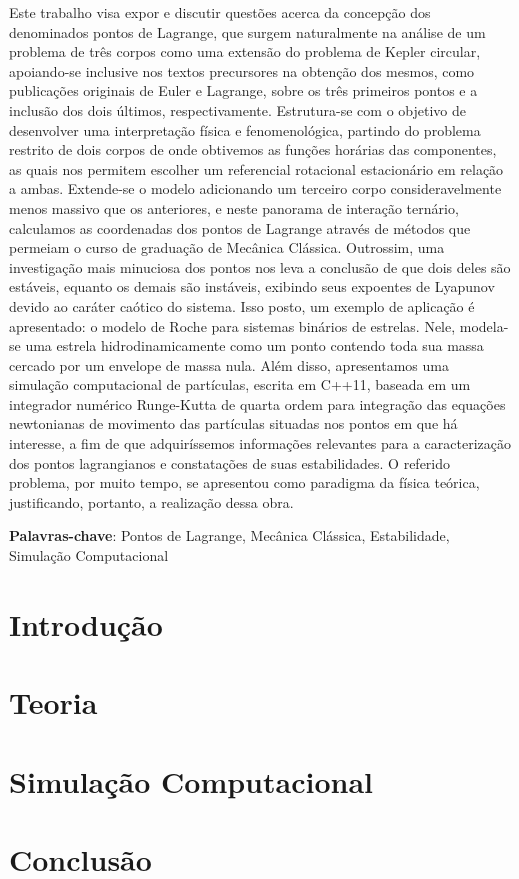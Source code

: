 \documentclass[10pt,twoside,a4paper,brazil]{abntex2}
\begin{document}
   \imprimircapa
   
   \imprimirfolhaderosto   
   
   \tableofcontents

	 \newpage
	 
   \begin{resumo}
      Este trabalho visa expor e discutir questões acerca da concepção dos denominados pontos de Lagrange, que surgem naturalmente na análise de um problema de três corpos como uma extensão do problema de Kepler circular, apoiando-se inclusive nos textos precursores na obtenção dos mesmos, como publicações originais de Euler e Lagrange, sobre os três primeiros pontos e a inclusão dos dois últimos, respectivamente. Estrutura-se com o objetivo de desenvolver uma interpretação física e fenomenológica, partindo do problema restrito de dois corpos de onde obtivemos as funções horárias das componentes, as quais nos permitem escolher um referencial rotacional estacionário em relação a ambas. Extende-se o modelo adicionando um terceiro corpo consideravelmente menos massivo que os anteriores, e neste panorama de interação ternário, calculamos as coordenadas dos pontos de Lagrange através de métodos que permeiam o curso de graduação de Mecânica Clássica. Outrossim, uma investigação mais minuciosa dos pontos nos leva a conclusão de que dois deles são estáveis, equanto os demais são instáveis, exibindo seus expoentes de Lyapunov devido ao caráter caótico do sistema. Isso posto, um exemplo de aplicação é apresentado: o modelo de Roche para sistemas binários de estrelas. Nele, modela-se uma estrela hidrodinamicamente como um ponto contendo toda sua massa cercado por um envelope de massa nula. Além disso, apresentamos uma simulação computacional de partículas, escrita em C++11, baseada em um integrador numérico Runge-Kutta de quarta ordem para integração das equações newtonianas de movimento das partículas situadas nos pontos em que há interesse, a fim de que adquiríssemos informações relevantes para a caracterização dos pontos lagrangianos e constatações de suas estabilidades. O referido problema, por muito tempo, se apresentou como paradigma da física teórica, justificando, portanto, a realização dessa obra.

      \vspace{\onelineskip}
      \noindent
      \textbf{Palavras-chave}: Pontos de Lagrange, Mecânica Clássica, Estabilidade, Simulação Computacional
   \end{resumo}

   \chapter{Introdução}
      
      
   \chapter{Teoria}
      
     
   \chapter{Simulação Computacional}
      

   \chapter{Conclusão}
      

   
\end{document}
